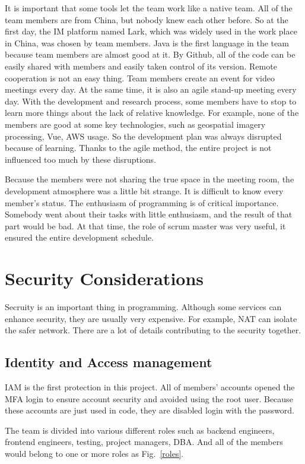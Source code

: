 \documentclass[conference]{IEEEtran}
\begin{document}
It is important that some tools let the team work like a native team. All of the team members are from China, but nobody knew each other before. 
So at the first day, the IM platform named Lark, which was widely used in the work place in China, was chosen by team members. Java is the first 
language in the team because team members are almost good at it. By Github, all of the code can be easily shared with members and easily taken 
control of its version. Remote cooperation is not an easy thing. Team members create an event for video meetings every day. At the same time, it 
is also an agile stand-up meeting every day. With the development and research process, some members have to stop to learn more things about the 
lack of relative knowledge. For example, none of the members are good at some key technologies, such as geospatial imagery processing, Vue, AWS usage. 
So the development plan was always disrupted because of learning. Thanks to the agile method, the entire project is not influenced too much by 
these disruptions. 

Because the members were not sharing the true space in the meeting room, the development atmosphere was a little bit strange. It is difficult to know 
every member's status. The enthusiasm of programming is of critical importance. Somebody went about their tasks with little enthusiasm, and the 
result of that part would be bad. At that time, the role of scrum master was very useful, it ensured the entire development schedule.

\section{Security Considerations}

Secruity is an important thing in programming. Although some services can enhance security, they are usually very expensive. For example, 
NAT can isolate the safer network. There are a lot of details contributing to the security together.

\subsection{Identity and Access management}

IAM is the first protection in this project. All of members' accounts opened the MFA login to ensure account security and avoided using the root user. 
Because these accounts are just used in code, they are disabled login with the password.

The team is divided into various different roles such as backend engineers, frontend engineers, 
testing, project managers, DBA. And all of the members would belong to one or more roles as Fig.~\ref{roles}. 
\end{document}
